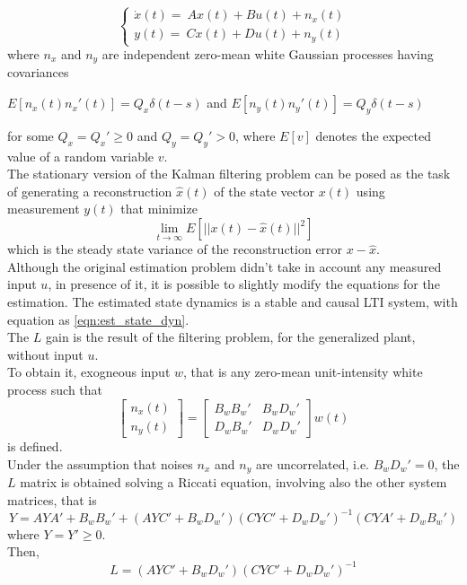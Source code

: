 \begin{equation}
	\begin{cases}
		\dot x(t) =\ A x(t) + B u(t) +n_x(t) \\
		y(t) =\ C x(t) + D u(t) + n_y(t)
	\end{cases}
\end{equation}
where $n_x$ and $n_y$ are independent zero-mean white Gaussian processes having covariances
\begin{center}
	$E[n_x(t)n_x'(t)]=Q_x \delta(t-s)$  and $E[n_y(t)n_y'(t)]=Q_y \delta(t-s) $
\end{center}
for some $Q_x = Q_x' \geq 0$ and $Q_y = Q_y' > 0$, where $E[v]$ denotes the expected value of a random variable $v$.\\
The stationary version of the Kalman filtering problem can be posed as the task of generating a reconstruction $\hat x (t)$ of the state vector $x(t)$ using measurement $y(t)$ that minimize 
\begin{equation}
	\lim_{t \to \infty }E[ ||x(t) - \hat x(t) ||^2 ]
\end{equation}
which is the steady state variance of the reconstruction error $ x-\hat x$.\\
Although the original estimation problem didn't take in account any measured input $u$, in presence of it, it is possible to slightly modify the equations for the estimation. 
The estimated state dynamics is a stable and causal LTI system, with equation as \cref{eqn:est_state_dyn}. \\
The $L$ gain is the result of the filtering problem, for the generalized plant, without input $u$. \\
To obtain it, exogneous input $w$, that is any zero-mean unit-intensity white process such that
\begin{equation}
	\begin{bmatrix}
		n_x(t) \\
		n_y(t)
	\end{bmatrix} = 
	\begin{bmatrix}
		B_wB_w'& B_wD_w'\\
		D_wB_w' & D_wD_w'
	\end{bmatrix} w(t)
\end{equation}
is defined. \\
Under the assumption that noises $n_x$ and $n_y$ are uncorrelated, i.e. $B_wD_w' = 0$, the $L$ matrix is obtained solving a Riccati equation, involving also the other system matrices, that is
\begin{equation}
	Y = AYA' + B_wB_w' + (AYC'+B_wD_w')(CYC'+D_wD_w')^{-1}(CYA'+D_wB_w')
	\label{eqn:riccati_kf}
\end{equation}
where $Y = Y' \geq 0$.\\
Then, 
\begin{equation}
	L = (AYC'+B_wD_w')(CYC'+D_wD_w')^{-1}
	\label{eqn:kf_gain}
\end{equation}

